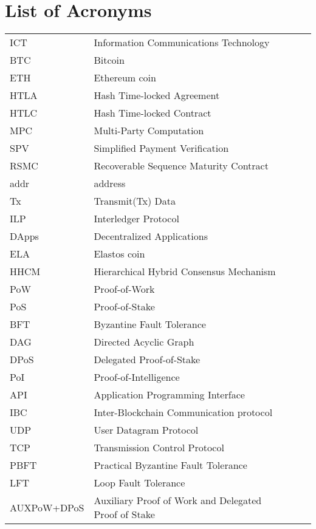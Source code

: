 \chapter{List of Acronyms}

\begin{table}[h]
\begin{tabular}{p{2.7cm}lp{8cm}l}

ICT               & Information Communications Technology \\
BTC              & Bitcoin \\ 	
ETH              & Ethereum coin\\
HTLA             & Hash Time-locked Agreement \\
HTLC             & Hash Time-locked Contract \\ 	
MPC              & Multi-Party Computation \\
SPV              & Simplified Payment Verification \\ 	
RSMC             & Recoverable Sequence Maturity Contract \\
addr             & address\\
Tx               & Transmit(Tx) Data \\
ILP              & Interledger Protocol \\ 	
DApps            & Decentralized Applications \\
ELA              & Elastos coin\\	
HHCM             & Hierarchical Hybrid Consensus Mechanism\\
PoW              & Proof-of-Work\\
PoS              & Proof-of-Stake\\
BFT              & Byzantine Fault Tolerance\\
DAG              & Directed Acyclic Graph\\
DPoS             & Delegated Proof-of-Stake\\
PoI              & Proof-of-Intelligence\\
API              & Application Programming Interface\\
IBC              & Inter-Blockchain Communication protocol\\
UDP              & User Datagram Protocol\\
TCP              & Transmission Control Protocol\\
PBFT             & Practical Byzantine Fault Tolerance\\
LFT              & Loop Fault Tolerance\\
AUXPoW+DPoS	 	 & Auxiliary Proof of Work and Delegated Proof of Stake\\
\end{tabular}
\end{table}